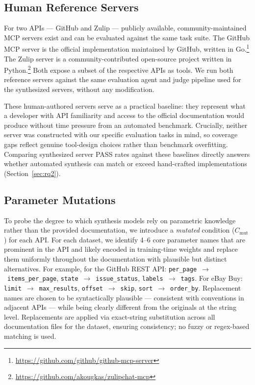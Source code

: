 \subsection{Human Reference Servers}

For two APIs --- GitHub and Zulip --- publicly available, community-maintained MCP servers exist and can be evaluated against the same task suite. The GitHub MCP server is the official implementation maintained by GitHub, written in Go.\footnote{\url{https://github.com/github/github-mcp-server}} The Zulip server is a community-contributed open-source project written in Python.\footnote{\url{https://github.com/akougkas/zulipchat-mcp}} Both expose a subset of the respective APIs as tools. We run both reference servers against the same evaluation agent and judge pipeline used for the synthesized servers, without any modification.

These human-authored servers serve as a practical baseline: they represent what a developer with API familiarity and access to the official documentation would produce without time pressure from an automated benchmark. Crucially, neither server was constructed with our specific evaluation tasks in mind, so coverage gaps reflect genuine tool-design choices rather than benchmark overfitting. Comparing synthesized server PASS rates against these baselines directly answers whether automated synthesis can match or exceed hand-crafted implementations (Section~\ref{sec:rq2}).

\subsection{Parameter Mutations}

To probe the degree to which synthesis models rely on parametric knowledge rather than the provided documentation, we introduce a \emph{mutated} condition ($C_{\text{mut}}$) for each API. For each dataset, we identify 4--6 core parameter names that are prominent in the API and likely encoded in training-time weights and replace them uniformly throughout the documentation with plausible but distinct alternatives. For example, for the GitHub REST API: 
\texttt{per\_page}~$\to$~\texttt{items\_per\_page}, \texttt{state}~$\to$~\texttt{issue\_status}, \texttt{labels}~$\to$~\texttt{tags}. For eBay Buy: \texttt{limit}~$\to$~\texttt{max\_results}, \texttt{offset}~$\to$~\texttt{skip}, \texttt{sort}~$\to$~\texttt{order\_by}. Replacement names are chosen to be syntactically plausible --- consistent with conventions in adjacent APIs --- while being clearly different from the originals at the string level. Replacements are applied via exact-string substitution across all documentation files for the dataset, ensuring consistency; no fuzzy or regex-based matching is used.

